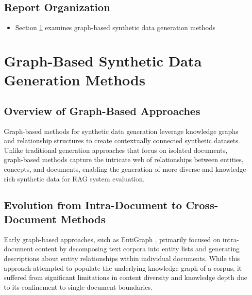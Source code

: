 \documentclass[11pt,a4paper]{article}
\begin{document}
\subsection{Report Organization}

\begin{itemize}
    \item Section \ref{sec:graph} examines graph-based synthetic data generation methods
\end{itemize}

\section{Graph-Based Synthetic Data Generation Methods}
\label{sec:graph}

\subsection{Overview of Graph-Based Approaches}

Graph-based methods for synthetic data generation leverage knowledge graphs and relationship structures to create contextually connected synthetic datasets. Unlike traditional generation approaches that focus on isolated documents, graph-based methods capture the intricate web of relationships between entities, concepts, and documents, enabling the generation of more diverse and knowledge-rich synthetic data for RAG system evaluation.

\subsection{Evolution from Intra-Document to Cross-Document Methods}

Early graph-based approaches, such as EntiGraph \cite{yang2024synthetic}, primarily focused on intra-document content by decomposing text corpora into entity lists and generating descriptions about entity relationships within individual documents. While this approach attempted to populate the underlying knowledge graph of a corpus, it suffered from significant limitations in content diversity and knowledge depth due to its confinement to single-document boundaries.
\end{document}
